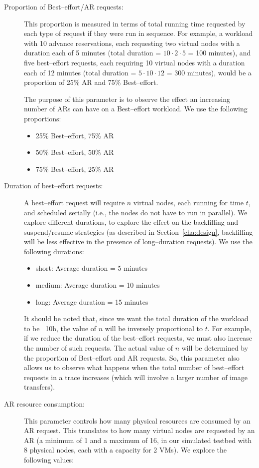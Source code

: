 \begin{description}
\item[Proportion of Best--effort/AR requests:] This proportion is measured in terms of total running time requested by each type of request if they were run in sequence. For example, a workload with 10 advance reservations, each requesting two virtual nodes with a duration each of 5 minutes (total duration = $10\cdot 2\cdot 5$ = 100 minutes), and five best--effort requests, each requiring 10 virtual nodes with a duration each of 12 minutes (total duration = $5\cdot 10\cdot 12$ = 300 minutes), would be a proportion of 25\% AR and 75\% Best--effort. 

The purpose of this parameter is to observe the effect an increasing number of ARs can have on a Best--effort workload. We use the following proportions:
\begin{itemize}
\item 25\% Best--effort, 75\% AR
\item 50\% Best--effort, 50\% AR
\item 75\% Best--effort, 25\% AR
\end{itemize}
\item[Duration of best--effort requests:] A best--effort request will require $n$ virtual nodes, each running for time $t$, and scheduled serially (i.e., the nodes do not have to run in parallel). We explore different durations, to explore the effect on the backfilling and suspend/resume strategies (as described in Section~\ref{cha:design}, backfilling will be less effective in the presence of long--duration requests). We use the following durations:
\begin{itemize}
\item short: Average duration = 5 minutes
\item medium: Average duration = 10 minutes
\item long: Average duration = 15 minutes
\end{itemize}
It should be noted that, since we want the total duration of the workload to be ~10h, the value of $n$ will be inversely proportional to $t$. For example, if we reduce the duration of the best--effort requests, we must also increase the number of such requests. The actual value of $n$ will be determined by the proportion of Best--effort and AR requests. So, this parameter also allows us to observe what happens when the total number of best--effort requests in a trace increases (which will involve a larger number of image transfers).
\item[AR resource consumption:] This parameter controls how many physical resources are consumed by an AR request. This translates to how many virtual nodes are requested by an AR (a minimum of 1 and a maximum of 16, in our simulated testbed with 8 physical nodes, each with a capacity for 2 VMs). We explore the following values:

\end{description}
